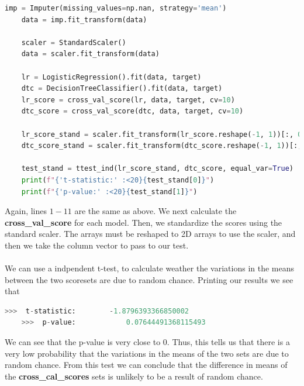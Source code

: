 \documentclass[12pt, letterpaper]{article}
\begin{document}
\begin{enumerate}
\begin{lstlisting}[language=python]
    imp = Imputer(missing_values=np.nan, strategy='mean')
    data = imp.fit_transform(data)
    
    scaler = StandardScaler()
    data = scaler.fit_transform(data)
    
    lr = LogisticRegression().fit(data, target)
    dtc = DecisionTreeClassifier().fit(data, target)
    lr_score = cross_val_score(lr, data, target, cv=10)
    dtc_score = cross_val_score(dtc, data, target, cv=10)
    
    lr_score_stand = scaler.fit_transform(lr_score.reshape(-1, 1))[:, 0]
    dtc_score_stand = scaler.fit_transform(dtc_score.reshape(-1, 1))[:, 0]
    
    test_stand = ttest_ind(lr_score_stand, dtc_score, equal_var=True)
    print(f"{'t-statistic:' :<20}{test_stand[0]}")
    print(f"{'p-value:' :<20}{test_stand[1]}")
\end{lstlisting}
    Again, lines $1-11$ are the same as above. We next calculate the {\bf cross\_val\_score} for each model. 
    Then, we standardize the scores using the standard scaler. The arrays must be reshaped to 2D arrays to use 
    the scaler, and then we take the column vector to pass to our test. \\ \\
    We can use a indpendent t-test, to calculate weather the variations in the means between the two scoresets 
    are due to random chance. Printing our results we see that
\begin{lstlisting}[language=python]
    >>>  t-statistic:        -1.8796393366850002
    >>>  p-value:            0.07644491368115493
\end{lstlisting}
    We can see that the p-value is very close to 0. Thus, this tells us that there is a very low probability 
    that the variations in the means of the two sets are due to random chance. From this test we can conclude 
    that the difference in means of the {\bf cross\_cal\_scores} sets is unlikely to be a result of random chance. 
\end{enumerate}

\newpage
\noindent\makebox[\linewidth]{\rule{18cm}{0.4pt}}
\end{document}

